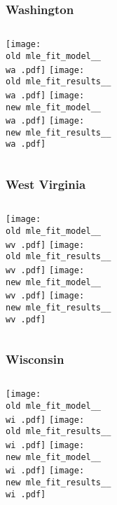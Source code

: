 \documentclass{beamer}
\newcommand{\old}{current_two_stage_output/pyseir/state_summaries/reports/}
\newcommand{\new}{new_shortest_t_delta/pyseir/state_summaries/reports/}
\newcommand{\wa}{Washington__53}
\newcommand{\wv}{West Virginia__54}
\newcommand{\wi}{Wisconsin__55}
\begin{document}
\begin{frame}
\frametitle{Washington}
    \begin{columns}[t]
       \texttt{[image: \\old mle\_fit\_model\_\_\\wa .pdf]}
       \texttt{[image: \\old mle\_fit\_results\_\_\\wa .pdf]}   
       \texttt{[image: \\new mle\_fit\_model\_\_\\wa .pdf]}
       \texttt{[image: \\new mle\_fit\_results\_\_\\wa .pdf]}   
\end{columns}
\end{frame}

\begin{frame}
\frametitle{West Virginia}
    \begin{columns}[t]
       \texttt{[image: \\old mle\_fit\_model\_\_\\wv .pdf]}
       \texttt{[image: \\old mle\_fit\_results\_\_\\wv .pdf]}   
       \texttt{[image: \\new mle\_fit\_model\_\_\\wv .pdf]}
       \texttt{[image: \\new mle\_fit\_results\_\_\\wv .pdf]}   
\end{columns}
\end{frame}

\begin{frame}
\frametitle{Wisconsin}
    \begin{columns}[t]
       \texttt{[image: \\old mle\_fit\_model\_\_\\wi .pdf]}
       \texttt{[image: \\old mle\_fit\_results\_\_\\wi .pdf]}   
       \texttt{[image: \\new mle\_fit\_model\_\_\\wi .pdf]}
       \texttt{[image: \\new mle\_fit\_results\_\_\\wi .pdf]}   
\end{columns}
\end{frame}
\end{document}
